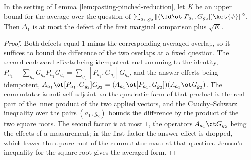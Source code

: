 \begin{lemma}
	\label{lem:pasting-pinched-cauchy-schwarz}
	\leanok
	In the setting of Lemma~\ref{lem:pasting-pinched-reduction}, let $K$ be an
	upper bound for the average over the question of
	$\sum_{a_1, g_2} \| (\Id \ot [P_{a_1}, G_{g_2}]) \ket{\psi} \|^2$. Then
	$\Delta_1$ is at most the defect of the first marginal comparison plus
	$\sqrt K$.
\end{lemma}
\begin{proof}
	\leanok
	Both defects equal $1$ minus the corresponding averaged overlap, so it
	suffices to bound the difference of the two overlaps at a fixed question.
	The second codeword effects being idempotent and summing to the identity,
	$P_{a_1} - \sum_{g_2} G_{g_2} P_{a_1} G_{g_2}
	= \sum_{g_2} [P_{a_1}, G_{g_2}] G_{g_2}$, and the answer effects being
	idempotent, $A_{a_1} \ot [P_{a_1}, G_{g_2}] G_{g_2}
	= (A_{a_1} \ot [P_{a_1}, G_{g_2}]) (A_{a_1} \ot G_{g_2})$. The commutator is
	anti-self-adjoint, so the quadratic form of that product is the real part of
	the inner product of the two applied vectors, and the Cauchy--Schwarz
	inequality over the pairs $(a_1, g_2)$ bounds the difference by the product
	of the two square roots. The second factor is at most $1$, the operators
	$A_{a_1} \ot G_{g_2}$ being the effects of a measurement; in the first factor
	the answer effect is dropped, which leaves the square root of the commutator
	mass at that question. Jensen's inequality for the square root gives the
	averaged form.
\end{proof}

